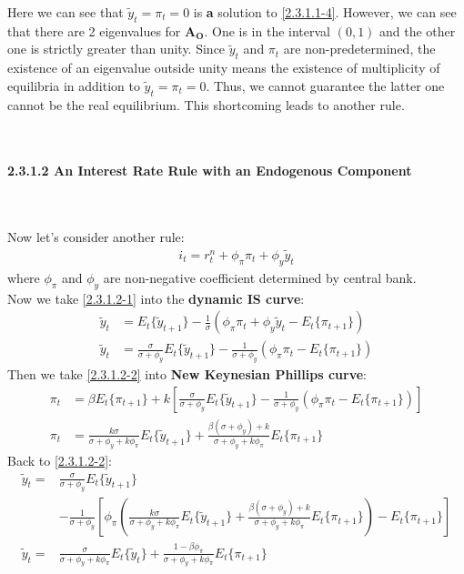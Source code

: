 \documentclass{article}
\numberwithin{equation}{section}
\begin{document}
Here we can see that $\tilde{y}_t = \pi_t = 0$ is \textbf{a} solution to \eqref{2.3.1.1-4}. However, we can see that there are 2 eigenvalues for $\boldsymbol{A_O}$. One is in the interval $(0, 1)$ and the other one is strictly greater than unity. Since $\tilde{y}_t$ and $\pi_t$ are non-predetermined, the existence of an eigenvalue outside unity means the existence of multiplicity of equilibria in addition to $\tilde{y}_t = \pi_t = 0$. Thus, we cannot guarantee the latter one cannot be the real equilibrium. This shortcoming leads to another rule.\\\\\\
\centerline{\textbf{2.3.1.2 An Interest Rate Rule with an Endogenous Component}}\\\\
Now let's consider another rule:
	\begin{align}
		i_t = r^n_t + \phi_\pi \pi_t + \phi_y \tilde{y}_t \label{2.3.1.2-1}
	\end{align}
where $\phi_\pi$ and $\phi_y$ are non-negative coefficient determined by central bank.\\
Now we take \eqref{2.3.1.2-1} into the \textbf{dynamic IS curve}:
	\begin{align}
		\tilde{y}_t &= E_t\{\tilde{y}_{t+1}\} - \frac{1}{\sigma}(\phi_\pi \pi_t + \phi_y \tilde{y}_t - E_t\{\pi_{t+1}\}) \nonumber\\
		\tilde{y}_t &= \frac{\sigma}{\sigma + \phi_y}E_t\{\tilde{y}_{t+1}\} - \frac{1}{\sigma + \phi_y}(\phi_\pi \pi_t - E_t\{\pi_{t+1}\}) \label{2.3.1.2-2}
	\end{align}
Then we take \eqref{2.3.1.2-2} into \textbf{New Keynesian Phillips curve}:
	\begin{align}
		\pi_t &= \beta E_t\{\pi_{t+1}\} + k\left[\frac{\sigma}{\sigma + \phi_y}E_t\{\tilde{y}_{t+1}\} - \frac{1}{\sigma + \phi_y}(\phi_\pi \pi_t - E_t\{\pi_{t+1}\})\right] \nonumber\\
		\pi_t &= \frac{k\sigma}{\sigma + \phi_y + k\phi_\pi} E_t\{\tilde{y}_{t+1}\} + \frac{\beta(\sigma + \phi_y) + k}{\sigma + \phi_y + k\phi_\pi} E_t\{\pi_{t+1}\} \label{2.3.1.2-3} 
	\end{align}
Back to \eqref{2.3.1.2-2}:
	\begin{align}
		\tilde{y}_t =& \frac{\sigma}{\sigma + \phi_y}E_t\{\tilde{y}_{t+1}\} \nonumber\\
		& - \frac{1}{\sigma + \phi_y} \left[ \phi_\pi \left( \frac{k\sigma}{\sigma + \phi_y + k\phi_\pi} E_t\{\tilde{y}_{t+1}\} + \frac{\beta(\sigma + \phi_y) + k}{\sigma + \phi_y + k\phi_\pi} E_t\{\pi_{t+1}\} \right) - E_t\{\pi_{t+1}\} \right] \nonumber\\
		\tilde{y}_t =& \frac{\sigma}{\sigma + \phi_y + k\phi_\pi} E_t\{\tilde{y}_t\} + \frac{1 - \beta\phi_\pi}{\sigma + \phi_y + k\phi_\pi} E_t\{\pi_{t+1}\} \label{2.3.1.2-4}
	\end{align}
\end{document}
